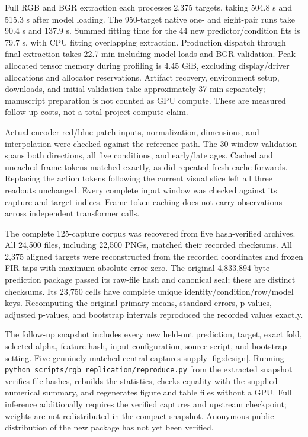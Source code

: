 \documentclass{article}
\begin{document}
Full RGB and BGR extraction each processes 2,375 targets, taking 504.8 s and 515.3 s after model loading. The 950-target native one- and eight-pair runs take 90.4 s and 137.9 s. Summed fitting time for the 44 new predictor/condition fits is 79.7 s, with CPU fitting overlapping extraction. Production dispatch through final extraction takes 22.7 min including model loads and BGR validation. Peak allocated tensor memory during profiling is 4.45 GiB, excluding display/driver allocations and allocator reservations. Artifact recovery, environment setup, downloads, and initial validation take approximately 37 min separately; manuscript preparation is not counted as GPU compute. These are measured follow-up costs, not a total-project compute claim.

Actual encoder red/blue patch inputs, normalization, dimensions, and interpolation were checked against the reference path. The 30-window validation spans both directions, all five conditions, and early/late ages. Cached and uncached frame tokens matched exactly, as did repeated fresh-cache forwards. Replacing the action tokens following the current visual slice left all three readouts unchanged. Every complete input window was checked against its capture and target indices. Frame-token caching does not carry observations across independent transformer calls.

The complete 125-capture corpus was recovered from five hash-verified archives. All 24,500 files, including 22,500 PNGs, matched their recorded checksums. All 2,375 aligned targets were reconstructed from the recorded coordinates and frozen FIR taps with maximum absolute error zero. The original 4,833,894-byte prediction package passed its raw-file hash and canonical seal; these are distinct checksums. Its 23,750 cells have complete unique identity/condition/row/model keys. Recomputing the original primary means, standard errors, p-values, adjusted p-values, and bootstrap intervals reproduced the recorded values exactly.

The follow-up snapshot includes every new held-out prediction, target, exact fold, selected alpha, feature hash, input configuration, source script, and bootstrap setting. Five genuinely matched central captures supply \autoref{fig:design}. Running \texttt{python scripts/rgb\_replication/reproduce.py} from the extracted snapshot verifies file hashes, rebuilds the statistics, checks equality with the supplied numerical summary, and regenerates figure and table files without a GPU. Full inference additionally requires the verified captures and upstream checkpoint; weights are not redistributed in the compact snapshot. Anonymous public distribution of the new package has not yet been verified.
\end{document}
